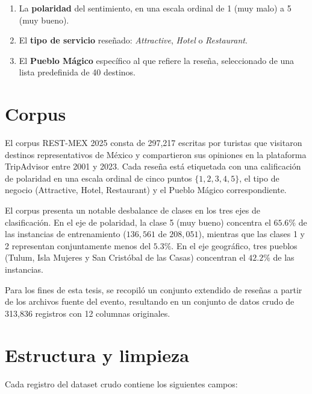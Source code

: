 \begin{enumerate}
	\item La \textbf{polaridad} del sentimiento, en una escala ordinal de 1 (muy malo) a 5 (muy bueno).
	\item El \textbf{tipo de servicio} reseñado: \textit{Attractive}, \textit{Hotel} o \textit{Restaurant}.
	\item El \textbf{Pueblo Mágico} específico al que refiere la reseña, seleccionado de una lista predefinida de 40 destinos.
\end{enumerate}

\section{Corpus} \label{sec:corpus}

El corpus REST-MEX 2025 consta de 297,217 escritas por turistas que visitaron destinos representativos de México y compartieron sus opiniones en la plataforma TripAdvisor entre 2001 y 2023. Cada reseña está etiquetada con una calificación de polaridad en una escala ordinal de cinco puntos $\{1, 2, 3, 4, 5\}$, el tipo de negocio (Attractive, Hotel, Restaurant) y el Pueblo Mágico correspondiente.

El corpus presenta un notable desbalance de clases en los tres ejes de clasificación. En el eje de polaridad, la clase 5 (muy bueno) concentra el $65.6\%$ de las instancias de entrenamiento ($136{,}561$ de $208{,}051$), mientras que las clases 1 y 2 representan conjuntamente menos del $5.3\%$. En el eje geográfico, tres pueblos (Tulum, Isla Mujeres y San Cristóbal de las Casas) concentran el $42.2\%$ de las instancias.

Para los fines de esta tesis, se recopiló un conjunto extendido de reseñas a partir de los archivos fuente del evento, resultando en un conjunto de datos crudo de 313,836 registros con 12 columnas originales.

\section{Estructura y limpieza} \label{sec:cleaning}

Cada registro del dataset crudo contiene los siguientes campos:

